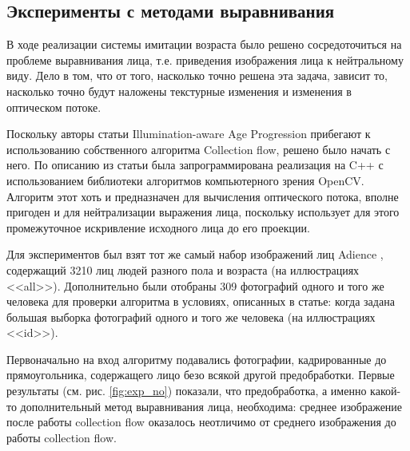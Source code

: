 \subsection{Эксперименты с методами выравнивания}

В ходе реализации системы имитации возраста было решено сосредоточиться на проблеме выравнивания лица, т.е. приведения изображения лица к нейтральному виду. Дело в том, что от того, насколько точно решена эта задача, зависит то, насколько точно будут наложены текстурные изменения и изменения в оптическом потоке.

Поскольку авторы статьи Illumination-aware Age Progression прибегают к использованию собственного алгоритма Collection flow, решено было начать с него. По описанию из статьи была запрограммирована реализация на C++ с использованием библиотеки алгоритмов компьютерного зрения OpenCV. 
Алгоритм этот хоть и предназначен для вычисления оптического потока, вполне пригоден и для нейтрализации выражения лица, поскольку использует для этого промежуточное искривление исходного лица до его проекции.

Для экспериментов был взят тот же самый набор изображений лиц Adience \cite{adience}, содержащий 3210 лиц людей разного пола и возраста (на иллюстрациях <<all>>). Дополнительно были отобраны 309 фотографий одного и того же человека для проверки алгоритма в условиях, описанных в статье: когда задана большая выборка фотографий одного и того же человека (на иллюстрациях <<id>>).

Первоначально на вход алгоритму подавались фотографии, кадрированные до прямоугольника, содержащего лицо безо всякой другой предобработки. Первые результаты (см. рис. \ref{fig:exp_no}) показали, что предобработка, а именно какой-то дополнительный метод выравнивания лица, необходима: среднее изображение после работы collection flow оказалось неотличимо от среднего изображения до работы collection flow.

